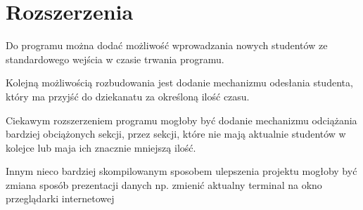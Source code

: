 \documentclass[a4paper,12pt]{article}
\begin{document}
	\section{Rozszerzenia}
	
	Do programu można dodać możliwość wprowadzania nowych studentów ze standardowego wejścia w czasie trwania programu.
	
	Kolejną możliwością rozbudowania jest dodanie mechanizmu odesłania studenta, który ma przyjść do dziekanatu za określoną ilość czasu.
	
	Ciekawym rozszerzeniem programu mogłoby być dodanie mechanizmu odciążania bardziej obciążonych sekcji, przez sekcji, które nie mają aktualnie studentów w kolejce lub maja ich znacznie mniejszą ilość.
	
	Innym nieco bardziej skompilowanym sposobem ulepszenia projektu mogłoby być zmiana sposób prezentacji danych np.	zmienić aktualny terminal na okno przeglądarki internetowej
\end{document}

